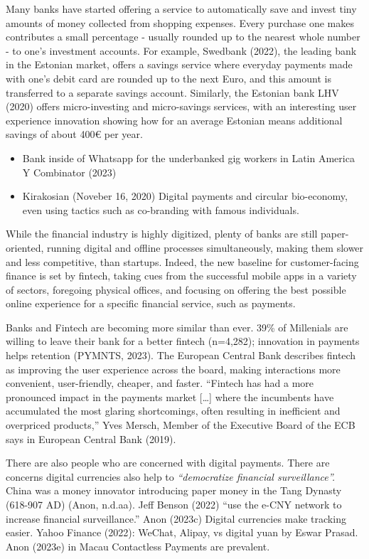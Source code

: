\documentclass[
  letterpaper,
  DIV=11,
  numbers=noendperiod]{scrartcl}
\providecommand{\tightlist}{%
  \setlength{\itemsep}{0pt}\setlength{\parskip}{0pt}}\usepackage{longtable,booktabs,array}
\begin{document}
Many banks have started offering a service to automatically save and
invest tiny amounts of money collected from shopping expenses. Every
purchase one makes contributes a small percentage - usually rounded up
to the nearest whole number - to one's investment accounts. For example,
Swedbank (2022), the leading bank in the Estonian market, offers a
savings service where everyday payments made with one's debit card are
rounded up to the next Euro, and this amount is transferred to a
separate savings account. Similarly, the Estonian bank LHV (2020) offers
micro-investing and micro-savings services, with an interesting user
experience innovation showing how for an average Estonian means
additional savings of about 400€ per year.

\begin{itemize}
\tightlist
\item
  Bank inside of Whatsapp for the underbanked gig workers in Latin
  America Y Combinator (2023)
\item
  Kirakosian (Noveber 16, 2020) Digital payments and circular
  bio-economy, even using tactics such as co-branding with famous
  individuals.
\end{itemize}

While the financial industry is highly digitized, plenty of banks are
still paper-oriented, running digital and offline processes
simultaneously, making them slower and less competitive, than startups.
Indeed, the new baseline for customer-facing finance is set by fintech,
taking cues from the successful mobile apps in a variety of sectors,
foregoing physical offices, and focusing on offering the best possible
online experience for a specific financial service, such as payments.

Banks and Fintech are becoming more similar than ever. 39\% of
Millenials are willing to leave their bank for a better fintech
(n=4,282); innovation in payments helps retention (PYMNTS, 2023). The
European Central Bank describes fintech as improving the user experience
across the board, making interactions more convenient, user-friendly,
cheaper, and faster. ``Fintech has had a more pronounced impact in the
payments market {[}\ldots{]} where the incumbents have accumulated the
most glaring shortcomings, often resulting in inefficient and overpriced
products,'' Yves Mersch, Member of the Executive Board of the ECB says
in European Central Bank (2019).

There are also people who are concerned with digital payments. There are
concerns digital currencies also help to \emph{``democratize financial
surveillance''.} China was a money innovator introducing paper money in
the Tang Dynasty (618-907 AD) (Anon, n.d.aa). Jeff Benson (2022) ``use
the e-CNY network to increase financial surveillance.'' Anon (2023c)
Digital currencies make tracking easier. Yahoo Finance (2022): WeChat,
Alipay, vs digital yuan by Eswar Prasad. Anon (2023e) in Macau
Contactless Payments are prevalent.
\end{document}
